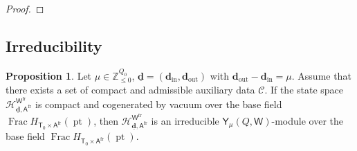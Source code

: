 \documentclass[10pt]{amsart}
\theoremstyle{definition}
\newtheorem{Proposition}[Theorem]{Proposition}
\numberwithin{equation}{section}
\newcommand{\bC}{\mathbb{C}}
\newcommand{\bZ}{\mathbb{Z}}
\newcommand{\bv}{\mathbf{v}}
\newcommand{\bd}{\mathbf{d}}
\newcommand{\cH}{\mathcal{H}}
\newcommand{\cN}{\mathcal{N}}
\newcommand{\fR}{\mathfrak{R}}
\newcommand{\fX}{\mathfrak{X}}
\newcommand{\sA}{\mathsf{A}}
\newcommand{\sT}{\mathsf{T}}
\newcommand{\sW}{\mathsf{W}}
\newcommand{\Frac}{\operatorname{Frac}}
\newcommand{\pt}{\operatorname{pt}}
\newcommand{\Stab}{\operatorname{Stab}}
\newcommand{\id}{\operatorname{id}}
\newcommand{\In}{\operatorname{in}}
\newcommand{\Out}{\operatorname{out}}
\begin{document}
\begin{proof}
\end{proof}


\subsection{Irreducibility}


\begin{Proposition}\label{prop on irr mod}
Let $\mu\in \bZ_{\leqslant 0}^{Q_0}$, $\underline{\bd}=(\bd_{\In},\bd_{\Out})$ with $\bd_{\Out}-\bd_{\In}=\mu$. Assume that there exists a set of compact and admissible auxiliary data $\mathcal C$. If the state space $\cH^{\sW^{\mathrm{fr}}}_{\underline{\bd},\sA^{\mathrm{fr}}}$ is compact and cogenerated by vacuum over the base field $\Frac H_{\sT_0\times \sA^{\mathrm{fr}}}(\pt)$, then $\cH^{\sW^{\mathrm{fr}}}_{\underline{\bd},\sA^{\mathrm{fr}}}$ is an irreducible $\mathsf Y_{\mu}(Q,\sW)$-module over the base field $\Frac H_{\sT_0\times \sA^{\mathrm{fr}}}(\pt)$.
\end{Proposition}
\end{document}
